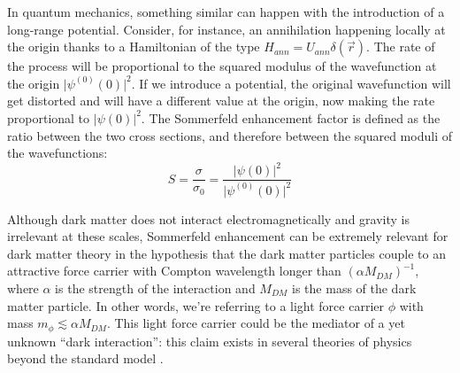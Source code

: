 In quantum mechanics, something similar can happen with the introduction of a long-range potential. Consider, for instance, an annihilation happening locally at the origin thanks to a Hamiltonian of the type \(H_{ann} = U_{ann} \delta (\vec{r})\). The rate of the process will be proportional to the squared modulus of the wavefunction at the origin \(\vert \psi ^{(0)}(0) \vert^2 \). If we introduce a potential, the original wavefunction will get distorted and will have a different value at the origin, now making the rate proportional to \(\vert \psi (0) \vert^2 \). The Sommerfeld enhancement factor is defined as the ratio between the two cross sections, and therefore between the squared moduli of the wavefunctions:
\begin{equation}\label{eq:sommerfeld_def}
	S = \frac{\sigma }{\sigma _0} = \frac{\vert \psi (0) \vert ^2}{\vert \psi ^{(0)}(0) \vert ^2}
\end{equation}

Although dark matter does not interact electromagnetically and gravity is irrelevant at these scales, Sommerfeld enhancement can be extremely relevant for dark matter theory in the hypothesis that the dark matter particles couple to an attractive force carrier with Compton wavelength longer than \((\alpha M_{DM})^{-1} \), where \(\alpha\) is the strength of the interaction and \(M_{DM} \) is the mass of the dark matter particle. In other words, we're referring to a light force carrier \(\phi \) with mass \(m_{\phi } \lesssim \alpha M_{DM} \). This light force carrier could be the mediator of a yet unknown ``dark interaction'': this claim exists in several theories of physics beyond the standard model \cite{Arkani_2009}.

